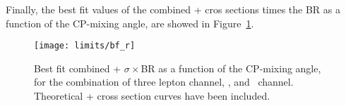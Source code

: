 Finally, the best fit values of the combined \tH + \ttH cros sections times the BR as a function of the CP-mixing angle, are showed in Figure~\ref{fig:bf_r}. 

\begin{figure} [!h]
      \centering
      \texttt{[image: limits/bf\_r]}\\
      \caption[Best fit combined \tH + \ttH $\sigma\times$BR as a function of the CP-mixing angle.]{Best fit combined \tH + \ttH $\sigma\times$BR as a function of the CP-mixing angle, for the combination of three lepton channel, \mumu, and \emu\ channel. Theoretical \tH + \ttH cross section curves have been included.}
\label{fig:bf_r}
\end{figure}

